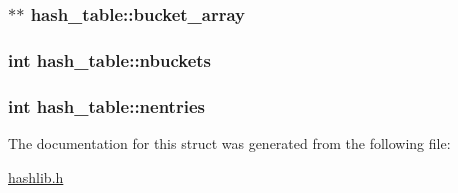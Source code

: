 \subsubsection[{\texorpdfstring{bucket\+\_\+array}{bucket_array}}]{$\ast$$\ast$ hash\+\_\+table\+::bucket\+\_\+array}\hypertarget{structhash__table_a8500015bb5f856d6051a122860e4968a}{}\label{structhash__table_a8500015bb5f856d6051a122860e4968a}
\subsubsection[{\texorpdfstring{nbuckets}{nbuckets}}]{\setlength{\rightskip}{0pt plus 5cm}int hash\+\_\+table\+::nbuckets}\hypertarget{structhash__table_aa7de201d163e121b359b32142d261e2f}{}\label{structhash__table_aa7de201d163e121b359b32142d261e2f}
\subsubsection[{\texorpdfstring{nentries}{nentries}}]{\setlength{\rightskip}{0pt plus 5cm}int hash\+\_\+table\+::nentries}\hypertarget{structhash__table_a9e1b774a04e87eb7bef46100c85ec52d}{}\label{structhash__table_a9e1b774a04e87eb7bef46100c85ec52d}


The documentation for this struct was generated from the following file\+:\begin{DoxyCompactItemize}
\item 
\hyperlink{hashlib_8h}{hashlib.\+h}\end{DoxyCompactItemize}
